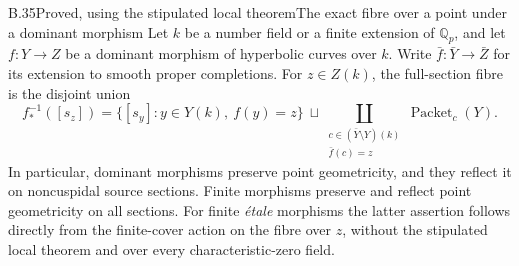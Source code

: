 \begin{statement}{B.35}{Proved, using the stipulated local theorem}{The exact fibre over a point under a dominant morphism}
Let $k$ be a number field or a finite extension of
$\mathbb Q_p$, and let $f:Y\to Z$ be a dominant morphism
of hyperbolic curves over $k$. Write
$\bar f:\bar Y\to\bar Z$ for its extension to smooth
proper completions. For $z\in Z(k)$, the full-section
fibre is the disjoint union
\[
 f_*^{-1}([s_z])
 =\{[s_y]:y\in Y(k),\ f(y)=z\}
 \ \sqcup\!
 \coprod_{\substack{c\in(\bar Y\setminus Y)(k)\\
                         \bar f(c)=z}}
                  \operatorname{Packet}_c(Y).
 \tag{B.35.1}
\]
In particular, dominant morphisms preserve point
geometricity, and they reflect it on noncuspidal source
sections. Finite morphisms preserve and reflect point
geometricity on all sections. For finite \emph{\'etale}
morphisms the latter assertion follows directly from
the finite-cover action on the fibre over $z$, without
the stipulated local theorem and over every
characteristic-zero field.
\end{statement}
